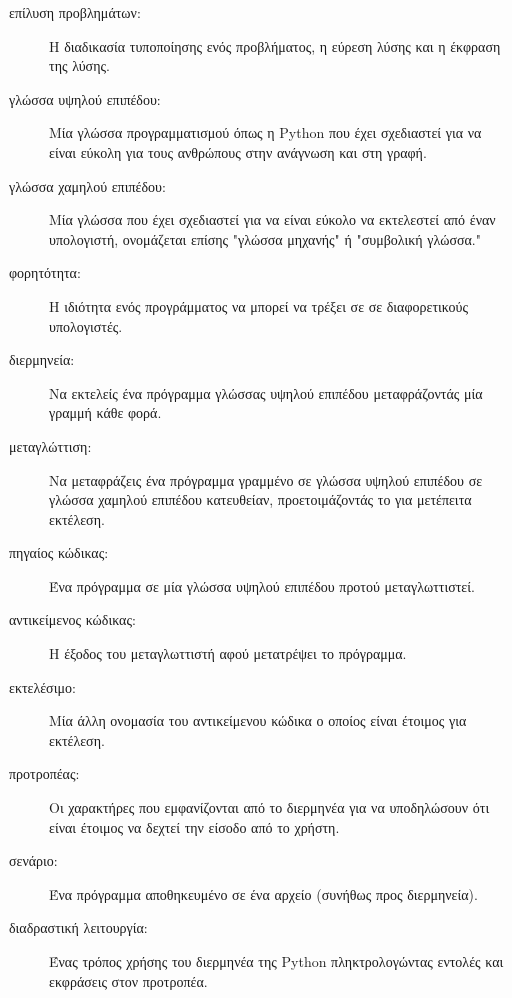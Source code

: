 \documentclass[10pt]{book}
\begin{document}
\begin{description}

\item[επίλυση προβλημάτων:]  Η διαδικασία τυποποίησης ενός προβλήματος,
	η εύρεση λύσης και η έκφραση της λύσης.

\item[γλώσσα υψηλού επιπέδου:]  Μία γλώσσα προγραμματισμού όπως η 
	Python  που έχει σχεδιαστεί για να είναι εύκολη για τους ανθρώπους
	στην ανάγνωση και στη γραφή.

\item[γλώσσα χαμηλού επιπέδου:]  Μία γλώσσα που έχει σχεδιαστεί για να είναι
	εύκολο να εκτελεστεί από έναν υπολογιστή, ονομάζεται επίσης "γλώσσα μηχανής" ή
	"συμβολική γλώσσα."

\item[φορητότητα:]  Η ιδιότητα ενός προγράμματος να μπορεί να τρέξει σε
	σε διαφορετικούς υπολογιστές.

\item[διερμηνεία:]  Να εκτελείς ένα πρόγραμμα γλώσσας υψηλού επιπέδου
	μεταφράζοντάς μία γραμμή κάθε φορά.

\item[μεταγλώττιση:]  Να μεταφράζεις ένα πρόγραμμα γραμμένο σε γλώσσα
	υψηλού επιπέδου σε γλώσσα χαμηλού επιπέδου κατευθείαν, προετοιμάζοντάς το
	για μετέπειτα εκτέλεση.

\item[πηγαίος κώδικας:]  Ένα πρόγραμμα σε μία γλώσσα υψηλού επιπέδου
	προτού μεταγλωττιστεί.

\item[αντικείμενος κώδικας:]  Η έξοδος του μεταγλωττιστή αφού μετατρέψει
	το πρόγραμμα.

\item[εκτελέσιμο:]  Μία άλλη ονομασία του αντικείμενου κώδικα ο οποίος
	είναι έτοιμος για εκτέλεση.

\item[προτροπέας:] Οι χαρακτήρες που εμφανίζονται από το διερμηνέα για να 
	υποδηλώσουν ότι είναι έτοιμος να δεχτεί την είσοδο από το χρήστη.

\item[σενάριο:] Ένα πρόγραμμα αποθηκευμένο σε ένα αρχείο (συνήθως προς
	διερμηνεία).

\item[διαδραστική λειτουργία:] Ένας τρόπος χρήσης του διερμηνέα της
	 Python  πληκτρολογώντας εντολές και εκφράσεις στον προτροπέα.


\end{description}
\end{document}
